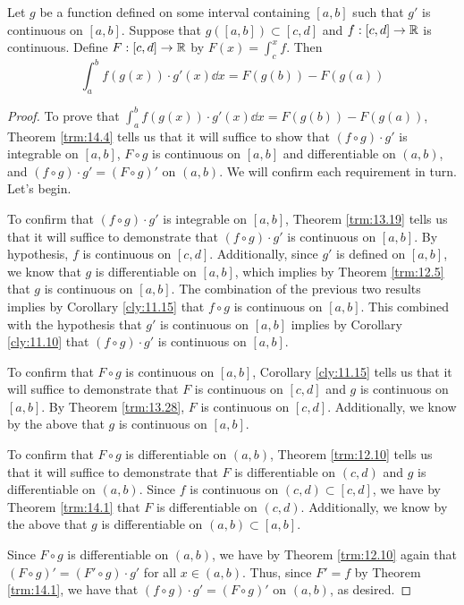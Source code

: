 \documentclass[../main.tex]{subfiles}
\begin{document}
\begin{corollary}[Substitution]\label{cly:14.6}
    Let $g$ be a function defined on some interval containing $[a,b]$ such that $g'$ is continuous on $[a,b]$. Suppose that $g([a,b])\subset[c,d]$ and $f:[c,d]\to\mathbb{R}$ is continuous. Define $F:[c,d]\to\mathbb{R}$ by $F(x)=\int_c^xf$. Then
    \begin{equation*}
        \int_a^bf(g(x))\cdot g'(x)\dd{x} = F(g(b))-F(g(a))
    \end{equation*}
    \begin{proof}
        To prove that $\int_a^bf(g(x))\cdot g'(x)\dd{x}=F(g(b))-F(g(a))$, Theorem \ref{trm:14.4} tells us that it will suffice to show that $(f\circ g)\cdot g'$ is integrable on $[a,b]$, $F\circ g$ is continuous on $[a,b]$ and differentiable on $(a,b)$, and $(f\circ g)\cdot g'=(F\circ g)'$ on $(a,b)$. We will confirm each requirement in turn. Let's begin.\par
        To confirm that $(f\circ g)\cdot g'$ is integrable on $[a,b]$, Theorem \ref{trm:13.19} tells us that it will suffice to demonstrate that $(f\circ g)\cdot g'$ is continuous on $[a,b]$. By hypothesis, $f$ is continuous on $[c,d]$. Additionally, since $g'$ is defined on $[a,b]$, we know that $g$ is differentiable on $[a,b]$, which implies by Theorem \ref{trm:12.5} that $g$ is continuous on $[a,b]$. The combination of the previous two results implies by Corollary \ref{cly:11.15} that $f\circ g$ is continuous on $[a,b]$. This combined with the hypothesis that $g'$ is continuous on $[a,b]$ implies by Corollary \ref{cly:11.10} that $(f\circ g)\cdot g'$ is continuous on $[a,b]$.\par
        To confirm that $F\circ g$ is continuous on $[a,b]$, Corollary \ref{cly:11.15} tells us that it will suffice to demonstrate that $F$ is continuous on $[c,d]$ and $g$ is continuous on $[a,b]$. By Theorem \ref{trm:13.28}, $F$ is continuous on $[c,d]$. Additionally, we know by the above that $g$ is continuous on $[a,b]$.\par
        To confirm that $F\circ g$ is differentiable on $(a,b)$, Theorem \ref{trm:12.10} tells us that it will suffice to demonstrate that $F$ is differentiable on $(c,d)$ and $g$ is differentiable on $(a,b)$. Since $f$ is continuous on $(c,d)\subset[c,d]$, we have by Theorem \ref{trm:14.1} that $F$ is differentiable on $(c,d)$. Additionally, we know by the above that $g$ is differentiable on $(a,b)\subset[a,b]$.\par
        Since $F\circ g$ is differentiable on $(a,b)$, we have by Theorem \ref{trm:12.10} again that $(F\circ g)'=(F'\circ g)\cdot g'$ for all $x\in(a,b)$. Thus, since $F'=f$ by Theorem \ref{trm:14.1}, we have that $(f\circ g)\cdot g'=(F\circ g)'$ on $(a,b)$, as desired.
    \end{proof}
\end{corollary}
\end{document}

